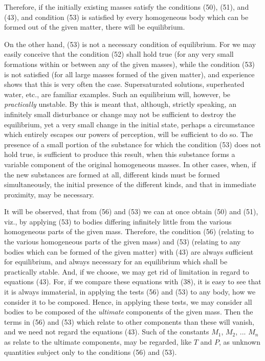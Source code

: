 \documentclass[12pt]{memoir}
\begin{document}
Therefore, if the initially existing masses satisfy the conditions (50),
(51), and (43), and condition (53) is satisfied by every homogeneous body which can be formed out of the given matter, there will be equilibrium.


On the other hand, (53) is not a necessary condition of equilibrium.
For we may easily conceive that the condition (52) shall hold true (for any very small formations within or between any of the given masses), while the condition (53) is not satisfied (for all large masses formed of the given matter), and experience shows that this is very often the case. Supersaturated solutions, superheated water, etc., are familiar examples. Such an equilibrium will, however, be \textit{practically} unstable. By this is meant that, although, strictly speaking, an infinitely small disturbance or change may not be sufficient to destroy the equilibrium, yet a very small change in the initial state, perhaps a circumstance which entirely escapes our powers of perception, will be sufficient to do so. The presence of a small portion of the substance for which the condition (53) does not hold true, is sufficient to produce this result, when this substance forms a variable component of the original homogeneous masses. In other cases, when, if the new substances are formed at all, different kinds must be formed simultaneously, the initial presence of the different kinds, and that in immediate proximity, may be necessary.


It will be observed, that from (56) and (53) we can at once obtain (50) and (51), viz., by applying (53) to bodies differing infinitely little from the various homogeneous parts of the given mass. Therefore, the condition (56) (relating to the various homogeneous parts of the given mass) and (53) (relating to any bodies which can be formed of the given matter) with (43) are always sufficient for equilibrium, and always necessary for an equilibrium which shall be practically stable. And, if we choose, we may get rid of limitation in regard to equations (43). For, if we compare these equations with (38), it is easy to see that it is always immaterial, in applying the tests (56) and (53) to any body, how we consider it to be composed. Hence, in applying these tests, we may consider all bodies to be composed of the \textit{ultimate} components of the given mass. Then the terms in (56) and (53) which relate to other components than these will vanish, and we need not regard the equations (43). Such of the constants $M_1$, $M_2$, ... $M_n$ as relate to the ultimate components, may be regarded, like $T$ and $P$, as unknown quantities subject only to the conditions (56) and (53).
\end{document}

